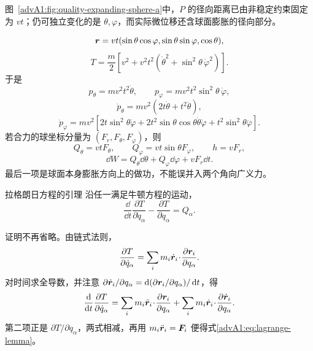 \begin{advsolution}
\begin{qualityfigure}
\label{advA1:fig:quality-expanding-sphere-a}
\end{qualityfigure}
图~\ref{advA1:fig:quality-expanding-sphere-a}中，$P$ 的径向距离已由非稳定约束固定为 $vt$；仍可独立变化的是 $\theta,\varphi$，而实际微位移还含球面膨胀的径向部分。

\[
 \bm{r}=vt(\sin\theta\cos\varphi,\sin\theta\sin\varphi,\cos\theta),
\]
\[
 T=\frac m2\left[v^2+v^2t^2
 (\dot\theta^2+\sin^2\theta\,\dot\varphi^2)\right].
\]
于是
\[
 p_\theta=mv^2t^2\dot\theta,
 \qquad p_\varphi=mv^2t^2\sin^2\theta\,\dot\varphi,
\]
\[
 \dot p_\theta=mv^2(2t\dot\theta+t^2\ddot\theta),
\]
\[
 \dot p_\varphi=mv^2\!\left[
 2t\sin^2\theta\dot\varphi
 +2t^2\sin\theta\cos\theta\dot\theta\dot\varphi
 +t^2\sin^2\theta\ddot\varphi\right].
\]
若合力的球坐标分量为 $(F_r,F_\theta,F_\varphi)$，则
\[
 Q_\theta=vtF_\theta,\qquad Q_\varphi=vt\sin\theta F_\varphi,
 \qquad h=vF_r,
\]
\[
 \dd W=Q_\theta\dd\theta+Q_\varphi\dd\varphi+vF_r\dd t.
\]
最后一项是球面本身膨胀方向上的做功，不能误并入两个角向广义力。
\end{advsolution}

\begin{advtheorem}{拉格朗日方程的引理}\label{advA1:thm:lagrange-lemma}
沿任一满足牛顿方程的运动，
\begin{equation}\label{advA1:eq:lagrange-lemma}
 \frac{\dd}{\dd t}\frac{\partial T}{\partial\dot q_\alpha}
 -\frac{\partial T}{\partial q_\alpha}=Q_\alpha .
\end{equation}
\end{advtheorem}
证明不再省略。由链式法则，
\[
 \frac{\partial T}{\partial\dot q_\alpha}
 =\sum_i m_i\dot{\bm{r}}_i\!\cdot\!
 \frac{\partial\bm{r}_i}{\partial q_\alpha}.
\]
对时间求全导数，并注意
$\partial\dot{\bm{r}}_i/\partial q_\alpha
=\mathop{}\!\mathrm d(\partial\bm{r}_i/\partial q_\alpha)/\mathop{}\!\mathrm d t$，得
\[
 \frac{\mathop{}\!\mathrm d}{\mathop{}\!\mathrm d t}\frac{\partial T}{\partial\dot q_\alpha}
 =\sum_i m_i\ddot{\bm{r}}_i\!\cdot\!
 \frac{\partial\bm{r}_i}{\partial q_\alpha}
 +\sum_i m_i\dot{\bm{r}}_i\!\cdot\!
 \frac{\partial\dot{\bm{r}}_i}{\partial q_\alpha}.
\]
第二项正是 $\partial T/\partial q_\alpha$，两式相减，再用
$m_i\ddot{\bm{r}}_i=\bm{F}_i$ 便得式\eqref{advA1:eq:lagrange-lemma}。

